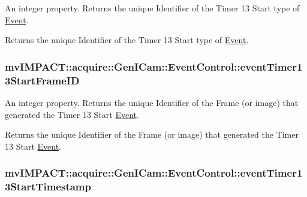 An integer property. Returns the unique Identifier of the Timer 13 Start type of \hyperlink{classmv_i_m_p_a_c_t_1_1acquire_1_1_event}{Event}. 

Returns the unique Identifier of the Timer 13 Start type of \hyperlink{classmv_i_m_p_a_c_t_1_1acquire_1_1_event}{Event}. \hypertarget{classmv_i_m_p_a_c_t_1_1acquire_1_1_gen_i_cam_1_1_event_control_af5333d33d2d9b8130c7e4ce393c12d8e}{
\subsubsection[{event\+Timer13\+Start\+Frame\+I\+D}]{ mv\+I\+M\+P\+A\+C\+T\+::acquire\+::\+Gen\+I\+Cam\+::\+Event\+Control\+::event\+Timer13\+Start\+Frame\+I\+D}}\label{classmv_i_m_p_a_c_t_1_1acquire_1_1_gen_i_cam_1_1_event_control_af5333d33d2d9b8130c7e4ce393c12d8e}


An integer property. Returns the unique Identifier of the Frame (or image) that generated the Timer 13 Start \hyperlink{classmv_i_m_p_a_c_t_1_1acquire_1_1_event}{Event}. 

Returns the unique Identifier of the Frame (or image) that generated the Timer 13 Start \hyperlink{classmv_i_m_p_a_c_t_1_1acquire_1_1_event}{Event}. \hypertarget{classmv_i_m_p_a_c_t_1_1acquire_1_1_gen_i_cam_1_1_event_control_aba0c798f01b1285d20626a224fcb0130}{
\subsubsection[{event\+Timer13\+Start\+Timestamp}]{ mv\+I\+M\+P\+A\+C\+T\+::acquire\+::\+Gen\+I\+Cam\+::\+Event\+Control\+::event\+Timer13\+Start\+Timestamp}}\label{classmv_i_m_p_a_c_t_1_1acquire_1_1_gen_i_cam_1_1_event_control_aba0c798f01b1285d20626a224fcb0130}


